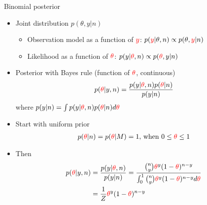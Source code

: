 \documentclass[english,t]{beamer}
\begin{document}
\begin{frame}{Binomial posterior}

  
  
  \begin{itemize}
  \item Joint distribution $p(\theta, y |  n)$
    \begin{itemize}
    \item Observation model as a function of ${\color{red}y}$:
      $p({\color{red}y}| \theta,n) \propto p(\theta, {\color{red}y} |  n)$
    \item Likelihood as a function of ${\color{red}\theta}$:
      $p(y| {\color{red}\theta},n) \propto p({\color{red}\theta}, y | n)$
    \end{itemize}
    \pause
  \item {\color{blue}Posterior} with Bayes rule (function of ${\color{red}\theta}$, continuous)
    \begin{equation*}
      p({\color{red}\theta}|y,n)=\frac{p(y|{\color{red}\theta},n)p({\color{red}\theta}|n)}{p(y|n)}
    \end{equation*}
    \pause
    where $p(y|n)=\int p(y|{\color{red}\theta},n)p({\color{red}\theta}|n) d{\color{red}\theta}$
  \item<4-> Start with uniform prior
    \begin{align*}
      p({\color{red}\theta}|n)=p({\color{red}\theta}|M)=1,\, \text{when}\,\, 0\leq{\color{red}\theta}\leq 1
    \end{align*}
  \item<5-> Then
    \begin{align*}
      p({\color{red}\theta}|y,n)&=\frac{p(y|{\color{red}\theta},n)}{p(y|n)} 
                                  =\frac{\binom{n}{y} {\color{red}\theta}^y(1-{\color{red}\theta})^{n-y}}{\int_0^1
                                  \binom{n}{y} {\color{red}\theta}^y(1-{\color{red}\theta})^{n-y} d{\color{red}\theta}} \\
                                &=\frac{1}{Z}{\color{red}\theta}^y(1-{\color{red}\theta})^{n-y}
    \end{align*}
  \end{itemize}

\end{frame}
\end{document}
